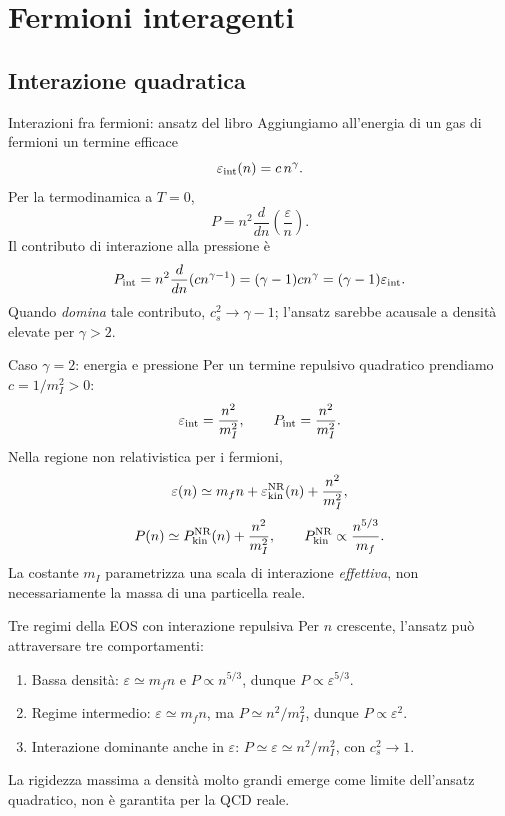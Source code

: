 \section{Fermioni interagenti}

\subsection{Interazione quadratica}

\begin{frame}[t]{Interazioni fra fermioni: ansatz del libro}
\small
Aggiungiamo all'energia di un gas di fermioni un termine efficace
\[
\varepsilon_{\rm int}(n)=c\,n^\gamma.
\]
Per la termodinamica a $T=0$,
\[
P=n^2\frac{d}{dn}\left(\frac\varepsilon n\right).
\]
Il contributo di interazione alla pressione è
\[
P_{\rm int}=n^2\frac{d}{dn}(c n^{\gamma-1})
=(\gamma-1)c n^\gamma=(\gamma-1)\varepsilon_{\rm int}.
\]
Quando \emph{domina} tale contributo, $c_s^2\to\gamma-1$; l'ansatz sarebbe acausale a densità elevate per $\gamma>2$.
\end{frame}

\begin{frame}[t]{Caso $\gamma=2$: energia e pressione}
\small
Per un termine repulsivo quadratico prendiamo $c=1/m_I^2>0$:
\[
\varepsilon_{\rm int}=\frac{n^2}{m_I^2},\qquad
P_{\rm int}=\frac{n^2}{m_I^2}.
\]
Nella regione non relativistica per i fermioni,
\[
\varepsilon(n)\simeq m_fn+\varepsilon_{\rm kin}^{\rm NR}(n)+\frac{n^2}{m_I^2},
\]
\[
P(n)\simeq P_{\rm kin}^{\rm NR}(n)+\frac{n^2}{m_I^2},
\qquad P_{\rm kin}^{\rm NR}\propto\frac{n^{5/3}}{m_f}.
\]
La costante $m_I$ parametrizza una scala di interazione \emph{effettiva}, non necessariamente la massa di una particella reale.
\end{frame}

\begin{frame}[t]{Tre regimi della EOS con interazione repulsiva}
\small
Per $n$ crescente, l'ansatz può attraversare tre comportamenti:
\begin{enumerate}
\item Bassa densità: $\varepsilon\simeq m_fn$ e $P\propto n^{5/3}$, dunque $P\propto\varepsilon^{5/3}$.
\item Regime intermedio: $\varepsilon\simeq m_fn$, ma $P\simeq n^2/m_I^2$, dunque $P\propto\varepsilon^2$.
\item Interazione dominante anche in $\varepsilon$: $P\simeq\varepsilon\simeq n^2/m_I^2$, con $c_s^2\to1$.
\end{enumerate}
La rigidezza massima a densità molto grandi emerge come limite dell'ansatz quadratico, non è garantita per la QCD reale.
\end{frame}

